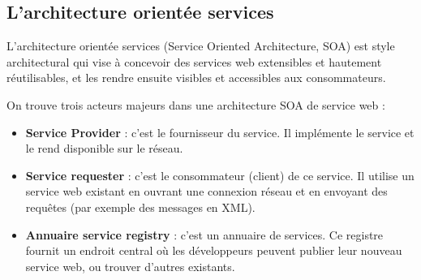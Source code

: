 \subsection{L'architecture orientée services} 
L'architecture orientée services (Service Oriented Architecture, SOA) est style architectural qui vise à concevoir des services web extensibles et hautement réutilisables, et les rendre ensuite visibles et accessibles aux consommateurs.
				
On trouve trois acteurs majeurs dans une architecture SOA de service web :
\begin{itemize}
	\item \textbf{Service Provider} : 
	      c'est le fournisseur du service. Il implémente le service et le rend disponible sur le réseau.
	\item \textbf{Service requester} :
	      c'est le consommateur (client) de ce service. Il utilise un service web existant en ouvrant une connexion réseau et en envoyant des requêtes (par exemple des messages en XML).
	\item \textbf{Annuaire service registry} : 
	      c'est un annuaire de services. Ce registre fournit un endroit central où les développeurs peuvent publier leur nouveau service web, ou trouver d'autres existants.\newline 
\end{itemize}

